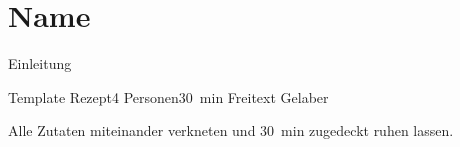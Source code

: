 \section{Name}
Einleitung

\begin{recipe}{Template Rezept}{4 Personen}{\SI{30}{\minute}}
    \freeform Freitext Gelaber

    Alle Zutaten miteinander verkneten und \SI{30}{\minute} zugedeckt ruhen lassen.
    \freeform\hrulefill
\end{recipe}
